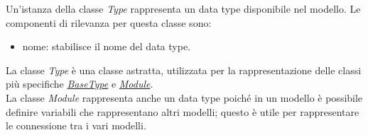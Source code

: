 
Un'istanza della classe \textit{Type} rappresenta un data type disponibile nel modello. Le componenti di rilevanza per questa classe sono:
\begin{itemize}
	\item nome: stabilisce il nome del data type.
\end{itemize}
La classe \textit{Type} è una classe astratta, utilizzata per la rappresentazione delle classi più specifiche \hyperref[sec:modelstranslator:anlysis:model_analysis:type:basetype]{\textit{BaseType}} e \hyperref[sec:modelstranslator:analysis:model_analysis:module]{\textit{Module}}. \\
La classe \textit{Module} rappresenta anche un data type poiché in un modello è possibile definire variabili che rappresentano altri modelli; questo è utile per rappresentare le connessione tra i vari modelli.

